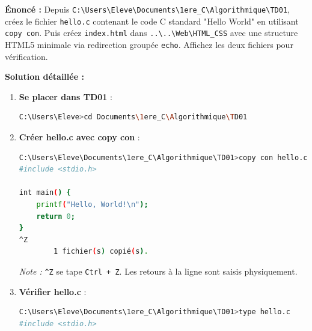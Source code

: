 \documentclass[11pt]{article}
\begin{document}
\begin{exoresolu}
\textbf{Énoncé :} Depuis \texttt{C:\textbackslash Users\textbackslash Eleve\textbackslash Documents\textbackslash 1ere\_C\textbackslash Algorithmique\textbackslash TD01}, créez le fichier \texttt{hello.c} contenant le code C standard "Hello World" en utilisant \texttt{copy con}. Puis créez \texttt{index.html} dans \texttt{..\textbackslash..\textbackslash Web\textbackslash HTML\_CSS} avec une structure HTML5 minimale via redirection groupée \texttt{echo}. Affichez les deux fichiers pour vérification.

\tcblower
\textbf{Solution détaillée :}

\begin{enumerate}
    \item \textbf{Se placer dans TD01} :
    \begin{lstlisting}[language=bash]
C:\Users\Eleve>cd Documents\1ere_C\Algorithmique\TD01
    \end{lstlisting}
    \item \textbf{Créer hello.c avec copy con} :
    \begin{lstlisting}[language=bash]
C:\Users\Eleve\Documents\1ere_C\Algorithmique\TD01>copy con hello.c
#include <stdio.h>

int main() {
    printf("Hello, World!\n");
    return 0;
}
^Z
        1 fichier(s) copié(s).
    \end{lstlisting}
    \textit{Note :} \texttt{\textasciicircum{}Z} se tape \texttt{Ctrl + Z}. Les retours à la ligne sont saisis physiquement.
    \item \textbf{Vérifier hello.c} :
    \begin{lstlisting}[language=bash]
C:\Users\Eleve\Documents\1ere_C\Algorithmique\TD01>type hello.c
#include <stdio.h>


\end{lstlisting}
\end{enumerate}
\end{exoresolu}
\end{document}
